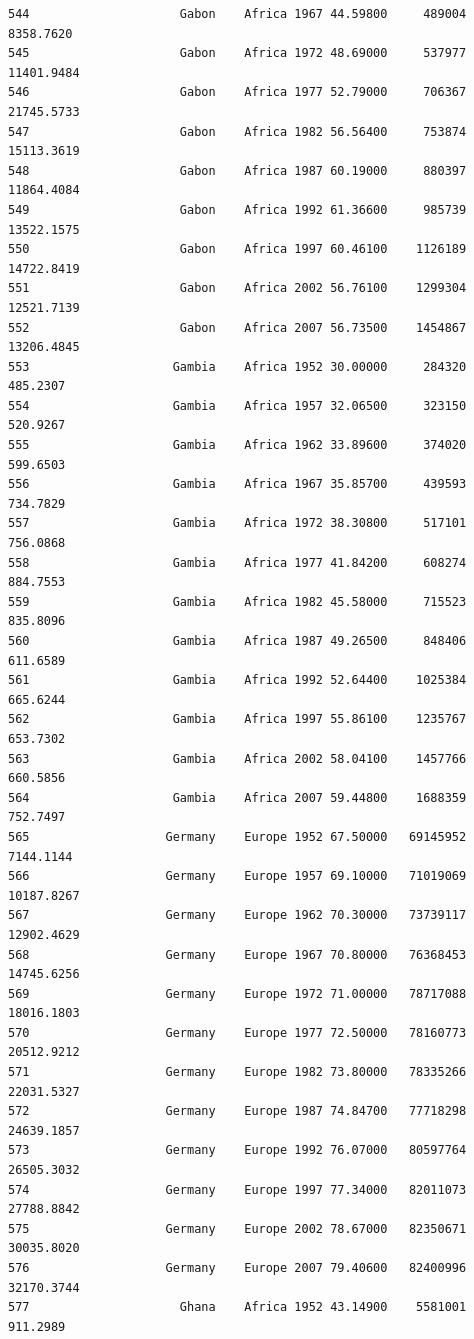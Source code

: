 \documentclass[
  letterpaper,
  DIV=11,
  numbers=noendperiod]{scrreprt}
\begin{document}
\begin{verbatim}
544                     Gabon    Africa 1967 44.59800     489004   8358.7620
545                     Gabon    Africa 1972 48.69000     537977  11401.9484
546                     Gabon    Africa 1977 52.79000     706367  21745.5733
547                     Gabon    Africa 1982 56.56400     753874  15113.3619
548                     Gabon    Africa 1987 60.19000     880397  11864.4084
549                     Gabon    Africa 1992 61.36600     985739  13522.1575
550                     Gabon    Africa 1997 60.46100    1126189  14722.8419
551                     Gabon    Africa 2002 56.76100    1299304  12521.7139
552                     Gabon    Africa 2007 56.73500    1454867  13206.4845
553                    Gambia    Africa 1952 30.00000     284320    485.2307
554                    Gambia    Africa 1957 32.06500     323150    520.9267
555                    Gambia    Africa 1962 33.89600     374020    599.6503
556                    Gambia    Africa 1967 35.85700     439593    734.7829
557                    Gambia    Africa 1972 38.30800     517101    756.0868
558                    Gambia    Africa 1977 41.84200     608274    884.7553
559                    Gambia    Africa 1982 45.58000     715523    835.8096
560                    Gambia    Africa 1987 49.26500     848406    611.6589
561                    Gambia    Africa 1992 52.64400    1025384    665.6244
562                    Gambia    Africa 1997 55.86100    1235767    653.7302
563                    Gambia    Africa 2002 58.04100    1457766    660.5856
564                    Gambia    Africa 2007 59.44800    1688359    752.7497
565                   Germany    Europe 1952 67.50000   69145952   7144.1144
566                   Germany    Europe 1957 69.10000   71019069  10187.8267
567                   Germany    Europe 1962 70.30000   73739117  12902.4629
568                   Germany    Europe 1967 70.80000   76368453  14745.6256
569                   Germany    Europe 1972 71.00000   78717088  18016.1803
570                   Germany    Europe 1977 72.50000   78160773  20512.9212
571                   Germany    Europe 1982 73.80000   78335266  22031.5327
572                   Germany    Europe 1987 74.84700   77718298  24639.1857
573                   Germany    Europe 1992 76.07000   80597764  26505.3032
574                   Germany    Europe 1997 77.34000   82011073  27788.8842
575                   Germany    Europe 2002 78.67000   82350671  30035.8020
576                   Germany    Europe 2007 79.40600   82400996  32170.3744
577                     Ghana    Africa 1952 43.14900    5581001    911.2989

\end{verbatim}
\end{document}
